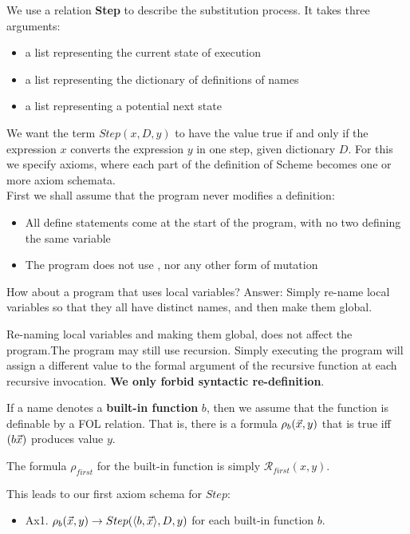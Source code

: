 \documentclass[english, 11pt]{article}
\begin{document}
  We use a relation \textbf{Step} to describe the substitution process. It takes three arguments:
  \begin{itemize}
    \item a list representing the current state of execution
    \item a list representing the dictionary of definitions of names
    \item a list representing a potential next state
  \end{itemize}
  We want the term $Step(x, D, y)$ to have the value true if and only if the expression $x$ converts the expression $y$ in one step, given dictionary $D$. For this we specify axioms, where each part of the definition of Scheme becomes one or more axiom schemata. \\

  First we shall assume that the program never modifies a definition:
  \begin{itemize}
    \item All define statements come at the start of the program, with no two defining the same variable
    \item The program does not use , nor any other form of mutation
  \end{itemize}
  How about a program that uses local variables? Answer: Simply re-name local variables so that they all have distinct names, and then make them global.

  \begin{rem}
    Re-naming local variables and making them global, does not affect the program.The program may still use recursion. Simply executing the program will assign a different value to the formal argument of the recursive function at each recursive invocation. \textbf{We only forbid syntactic re-definition}.
  \end{rem}

  If a name denotes a \textbf{built-in function} $b$, then we assume that the function is definable by a FOL relation. That is, there is a formula $\rho_b(\vec{x}, y)$ that is true iff $(b \vec{x})$ produces value $y$.

  \begin{exmp}
    The formula $\rho_{first}$ for the built-in function  is simply $\mathcal{R}_{first}(x,y)$.
  \end{exmp}

  This leads to our first axiom schema for $Step$:

  \begin{itemize}
    \item Ax1. $\rho_b(\vec{x} , y) \rightarrow Step(\langle b, \vec{x}\rangle , D, y)$ for each built-in function $b$.
  \end{itemize}
\end{document}
